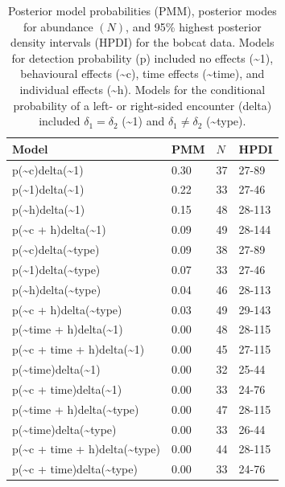 \documentclass[12pt]{article}
\begin{document}
\begin{table}[ht]
\centering
\begin{tabular}{llll}
  \hline
Model & PMM & $N$ & HPDI \\ 
  \hline
p(\~{}c)delta(\~{}1) & 0.30 & 37 & 27-89 \\ 
  p(\~{}1)delta(\~{}1) & 0.22 & 33 & 27-46 \\ 
  p(\~{}h)delta(\~{}1) & 0.15 & 48 & 28-113 \\ 
  p(\~{}c + h)delta(\~{}1) & 0.09 & 49 & 28-144 \\ 
  p(\~{}c)delta(\~{}type) & 0.09 & 38 & 27-89 \\ 
  p(\~{}1)delta(\~{}type) & 0.07 & 33 & 27-46 \\ 
  p(\~{}h)delta(\~{}type) & 0.04 & 46 & 28-113 \\ 
  p(\~{}c + h)delta(\~{}type) & 0.03 & 49 & 29-143 \\ 
  p(\~{}time + h)delta(\~{}1) & 0.00 & 48 & 28-115 \\ 
  p(\~{}c + time + h)delta(\~{}1) & 0.00 & 45 & 27-115 \\ 
  p(\~{}time)delta(\~{}1) & 0.00 & 32 & 25-44 \\ 
  p(\~{}c + time)delta(\~{}1) & 0.00 & 33 & 24-76 \\ 
  p(\~{}time + h)delta(\~{}type) & 0.00 & 47 & 28-115 \\ 
  p(\~{}time)delta(\~{}type) & 0.00 & 33 & 26-44 \\ 
  p(\~{}c + time + h)delta(\~{}type) & 0.00 & 44 & 28-115 \\ 
  p(\~{}c + time)delta(\~{}type) & 0.00 & 33 & 24-76 \\ 
   \hline
\end{tabular}
\caption{Posterior model probabilities (PMM), posterior modes for abundance $(N)$, and 95\% highest posterior density intervals (HPDI) for the bobcat data. Models for detection probability (p) included no effects (\~{}1), behavioural effects (\~{}c), time effects (\~{}time), and individual effects (\~{}h). Models for the conditional probability of a left- or right-sided encounter (delta) included $\delta_1=\delta_2$ (\~{}1) and $\delta_1 \ne \delta_2$ (\~{}type).} 
\label{tab:modprobs}
\end{table}
\end{document}
